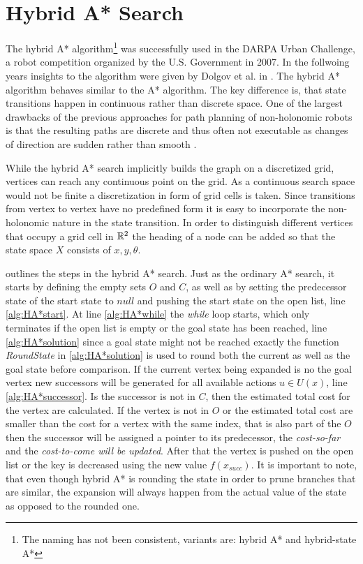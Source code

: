 \newpage
\section{Hybrid A* Search}\label{sec:HA}
The hybrid A* algorithm\footnote{The naming has not been consistent, variants are: hybrid A* and hybrid-state A*} was successfully used in the DARPA Urban Challenge, a robot competition organized by the U.S. Government in 2007. In the follwoing years insights to the algorithm were given by Dolgov et al. in \cite{Montemerlo.2008,Dolgov.2008,Dolgov.2009,Dolgov.2010}. The hybrid A* algorithm behaves similar to the A* algorithm. The key difference is, that state transitions happen in continuous rather than discrete space. One of the largest drawbacks of the previous approaches for path planning of non-holonomic robots is that the resulting paths are discrete and thus often not executable as changes of direction are sudden rather than smooth \cite{Montemerlo.2008,Dolgov.2010}.

While the hybrid A* search implicitly builds the graph on a discretized grid, vertices can reach any continuous point on the grid. As a continuous search space would not be finite a discretization in form of grid cells is taken. Since transitions from vertex to vertex have no predefined form it is easy to incorporate the non-holonomic nature in the state transition. In order to distinguish different vertices that occupy a grid cell in $\mathbb{R}^2$ the heading of a node can be added so that the state space $X$ consists of $x,y,\theta$.

 outlines the steps in the hybrid A* search. Just as the ordinary A* search, it starts by defining the empty sets $O$ and $C$, as well as by setting the predecessor state of the start state to $null$ and pushing the start state on the open list, line \ref{alg:HA*start}. At line \ref{alg:HA*while} the \textit{while} loop starts, which only terminates if the open list is empty or the goal state has been reached, line \ref{alg:HA*solution} since a goal state might not be reached exactly the function \textit{RoundState} in \ref{alg:HA*solution} is used to round both the current as well as the goal state before comparison.
If the current vertex being expanded is no the goal vertex new successors will be generated for all available actions $u  \in U(x)$, line \ref{alg:HA*successor}. Is the successor is not in $C$, then the estimated total cost for the vertex are calculated. If the vertex is not in $O$ or the estimated total cost are smaller than the cost for a vertex with the same index, that is also part of the $O$ then the successor will be assigned a pointer to its predecessor, the \textit{cost-so-far} and the \textit{cost-to-come will be updated}. After that the vertex is pushed on the open list or the key is decreased using the new value $f(x_{succ})$.
It is important to note, that even though hybrid A* is rounding the state in order to prune branches that are similar, the expansion will always happen from the actual value of the state as opposed to the rounded one.

